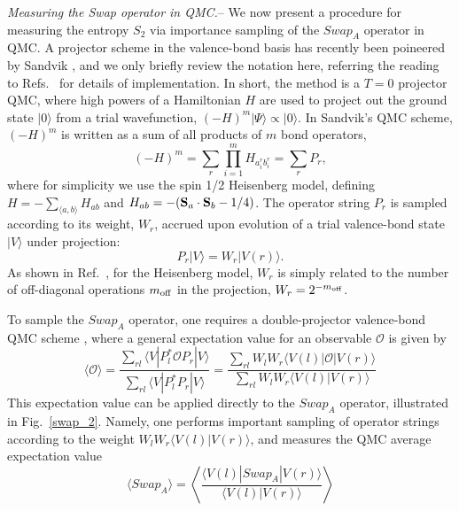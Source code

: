 \documentclass[prl,aps,twocolumn,floatfix,amsmath,amssymb,superscriptaddress,tightenlines]{revtex4}
\begin{document}
{\it Measuring the Swap operator in QMC.}--
We now present a procedure for measuring the entropy $S_2$ via importance sampling of the $Swap_A$ operator in QMC.  A
projector scheme in the valence-bond basis has recently been poineered by Sandvik \cite{Sandvik}, and we only briefly
review the notation here, referring the reading to Refs.~\cite{Sandvik,AWSloop} for details of implementation.
In short, the method is a $T=0$ projector QMC, where high powers of
a Hamiltonian $H$ are used to project out the ground state $|0\rangle$ from a trial wavefunction, 
$(-H)^m|\Psi \rangle \propto |0\rangle$.  In Sandvik's QMC scheme, $(-H)^m$ is written as a sum of all products of $m$ bond
operators,
\begin{equation}
(-H)^m = \sum_r \prod_{i=1}^m H_{a_i^r b_i^r} = \sum_r P_r,
\end{equation}
where for simplicity we use the spin 1/2 Heisenberg model, defining $H=-\sum_{\langle a,b \rangle}H_{ab}$ and 
$H_{ab} = -({\bf S}_a \cdot {\bf S}_b - 1/4)$.  The operator string $P_r$ is sampled according to its weight, $W_r$, accrued upon
evolution of a trial valence-bond state $|V \rangle$ under projection:
\begin{equation}
P_r |V \rangle = W_r |V(r) \rangle.
\end{equation}
As shown in Ref.~\cite{Sandvik}, for the Heisenberg model, $W_r$ is simply related to the number of off-diagonal 
operations $m_{\rm off}$ in the projection, $W_r = 2^{-m_{\rm off}}$.

To sample the $Swap_A$ operator, one requires a double-projector valence-bond QMC scheme \cite{Sandvik}, where
a general expectation value for an observable $\mathcal{O}$ is given by
\begin{equation}
\label{expect}
\langle \mathcal{O} \rangle = \frac{\sum_{rl} \langle V | P_l^* \mathcal{O} P_r | V \rangle} {\sum_{rl} \langle V | P_l^* P_r | V \rangle} 
= \frac{\sum_{rl} W_l W_r \langle V(l) | \mathcal{O} | V(r) \rangle} {\sum_{rl} W_l W_r \langle V(l) | V(r) \rangle}
\end{equation} 
This expectation value can be applied directly to the $Swap_A$ operator, illustrated in Fig.~\ref{swap_2}.  Namely, one 
performs important sampling of operator strings according to the weight $W_l W_r \langle V(l) | V(r) \rangle$, and measures
the QMC average expectation value
\begin{equation}
\langle Swap_A \rangle =  \left\langle{ \frac{ \langle V(l) | Swap_A | V(r) \rangle}{\langle V(l) | V(r) \rangle}  }\right\rangle 
\label{Swap}
\end{equation}
\end{document}

